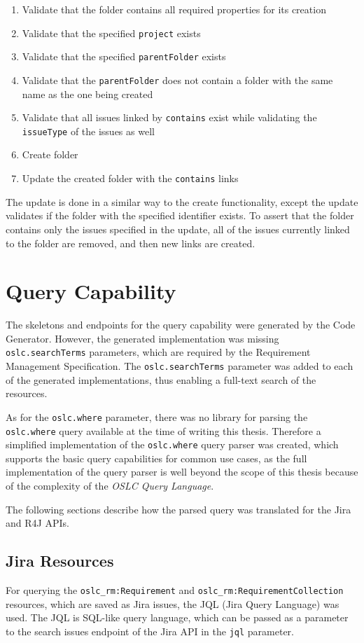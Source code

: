 \begin{enumerate}
  \item Validate that the folder contains all required properties for its creation
  \item Validate that the specified \texttt{project} exists
  \item Validate that the specified \texttt{parentFolder} exists
  \item Validate that the \texttt{parentFolder} does not contain a folder with the same name as the one being created
  \item Validate that all issues linked by \texttt{contains} exist while validating the \texttt{issueType} of the issues as well
  \item Create folder
  \item Update the created folder with the \texttt{contains} links
\end{enumerate}

The update is done in a similar way to the create functionality, except the update validates if the folder with the specified identifier exists. To assert that the folder contains only the issues specified in the update, all of the issues currently linked to the folder are removed, and then new links are created.

\section{Query Capability}
The skeletons and endpoints for the query capability were generated by the Code Generator. However, the generated implementation was missing \texttt{oslc.searchTerms} parameters, which are required by the Requirement Management Specification. The \texttt{oslc.searchTerms} parameter was added to each of the generated implementations, thus enabling a full-text search of the resources.

As for the \texttt{oslc.where} parameter, there was no library for parsing the \texttt{oslc.where} query available at the time of writing this thesis. Therefore a simplified implementation of the \texttt{oslc.where} query parser was created, which supports the basic query capabilities for common use cases, as the full implementation of the query parser is well beyond the scope of this thesis because of the complexity of the \emph{OSLC Query Language}.

The following sections describe how the parsed query was translated for the Jira and R4J APIs.

\subsection*{Jira Resources}
For querying the \texttt{oslc\_rm:Requirement} and \texttt{oslc\_rm:RequirementCollection} resources, which are saved as Jira issues, the JQL (Jira Query Language) \cite{jql} was used. The JQL is SQL-like query language, which can be passed as a parameter to the search issues endpoint of the Jira API in the \texttt{jql} parameter.

